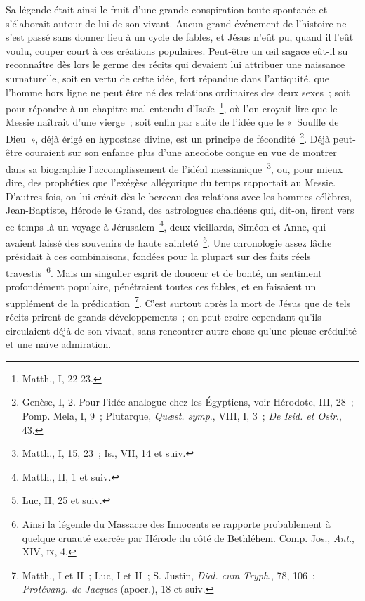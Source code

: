 \documentclass[french,twoside]{book} %
\begin{document}
Sa légende était ainsi le fruit d’une grande conspiration toute spontanée et s’élaborait autour de lui de son vivant. Aucun grand événement de l’histoire ne s’est passé sans donner lieu à un cycle de fables, et Jésus n’eût pu, quand il l’eût voulu, couper court à ces créations populaires. Peut-être un œil sagace eût-il su reconnaître dès lors le germe des récits qui devaient lui attribuer une naissance surnaturelle, soit en vertu de cette idée, fort répandue dans l’antiquité, que l’homme hors ligne ne peut être né des relations ordinaires des deux sexes ; soit pour répondre à un chapitre mal entendu d’Isaïe \footnote{Matth., I, 22-23.}, où l’on croyait lire que le Messie naîtrait d’une vierge ; soit enfin par suite de l’idée que le « Souffle de Dieu », déjà érigé en hypostase divine, est un principe de fécondité \footnote{ Genèse, I, 2. Pour l’idée analogue chez les Égyptiens, voir Hérodote, III, 28 ; Pomp. Mela, I, 9 ; Plutarque, {\itshape Quæst. symp}., VIII, I, 3 ; {\itshape De Isid. et Osir}., 43.}. Déjà peut-être couraient sur son enfance plus d’une anecdote conçue en vue de montrer dans sa biographie l’accomplissement de l’idéal messianique \footnote{Matth., I, 15, 23 ; Is., VII, 14 et suiv.}, ou, pour mieux dire, des prophéties que l’exégèse allégorique du temps rapportait au Messie. D’autres fois, on lui créait dès le berceau des relations avec les hommes célèbres, Jean-Baptiste, Hérode le Grand, des astrologues chaldéens qui, dit-on, firent vers ce temps-là un voyage à Jérusalem \footnote{Matth., II, 1 et suiv.}, deux vieillards, Siméon et Anne, qui avaient laissé des souvenirs de haute sainteté \footnote{Luc, II, 25 et suiv.}. Une chronologie assez lâche présidait à ces combinaisons, fondées pour la plupart sur des faits réels travestis \footnote{ Ainsi la légende du Massacre des Innocents se rapporte probablement à quelque cruauté exercée par Hérode du côté de Bethléhem. Comp. Jos., {\itshape Ant}., XIV, \textsc{ix}, 4.}. Mais un singulier esprit de douceur et de bonté, un sentiment profondément populaire, pénétraient toutes ces fables, et en faisaient un supplément de la prédication \footnote{ Matth., I et II ; Luc, I et II ; S. Justin, {\itshape Dial. cum Tryph}., 78, 106 ; {\itshape Protévang. de Jacques} (apocr.), 18 et suiv.}. C’est surtout après la mort de Jésus que de tels récits prirent de grands développements ; on peut croire cependant qu’ils circulaient déjà de son vivant, sans rencontrer autre chose qu’une pieuse crédulité et une naïve admiration.\par
\end{document}
